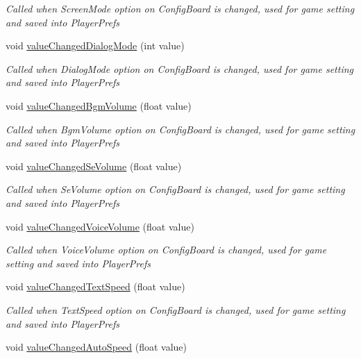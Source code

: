 \begin{DoxyCompactItemize}
\begin{DoxyCompactList}\small\item\em Called when Screen\+Mode option on Config\+Board is changed, used for game setting and saved into Player\+Prefs \end{DoxyCompactList}\item 
void \hyperlink{class_world_control_a0263e4517ff05cc485dc03b52b0ea84d}{value\+Changed\+Dialog\+Mode} (int value)
\begin{DoxyCompactList}\small\item\em Called when Dialog\+Mode option on Config\+Board is changed, used for game setting and saved into Player\+Prefs \end{DoxyCompactList}\item 
void \hyperlink{class_world_control_ac21379113088e81f889b78e63d90e3d6}{value\+Changed\+Bgm\+Volume} (float value)
\begin{DoxyCompactList}\small\item\em Called when Bgm\+Volume option on Config\+Board is changed, used for game setting and saved into Player\+Prefs \end{DoxyCompactList}\item 
void \hyperlink{class_world_control_a2577abdc948ee558066878b563c2bfc7}{value\+Changed\+Se\+Volume} (float value)
\begin{DoxyCompactList}\small\item\em Called when Se\+Volume option on Config\+Board is changed, used for game setting and saved into Player\+Prefs \end{DoxyCompactList}\item 
void \hyperlink{class_world_control_abcd92ceb74acb556c889ce652219312c}{value\+Changed\+Voice\+Volume} (float value)
\begin{DoxyCompactList}\small\item\em Called when Voice\+Volume option on Config\+Board is changed, used for game setting and saved into Player\+Prefs \end{DoxyCompactList}\item 
void \hyperlink{class_world_control_adad02d5d0484bd4204d6e0e39253dca8}{value\+Changed\+Text\+Speed} (float value)
\begin{DoxyCompactList}\small\item\em Called when Text\+Speed option on Config\+Board is changed, used for game setting and saved into Player\+Prefs \end{DoxyCompactList}\item 
void \hyperlink{class_world_control_a71972fc10c5a2734a9a8c10849c60faf}{value\+Changed\+Auto\+Speed} (float value)

\end{DoxyCompactItemize}
